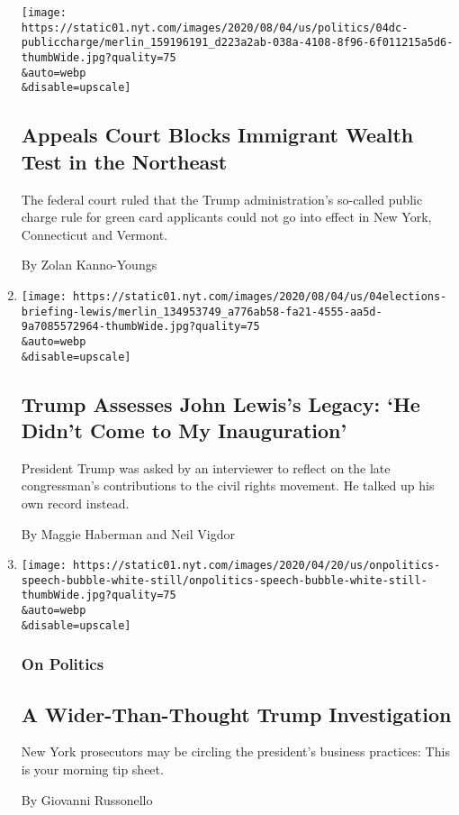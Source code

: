\begin{enumerate}
  \texttt{[image: https://static01.nyt.com/images/2020/08/04/us/politics/04dc-publiccharge/merlin\_159196191\_d223a2ab-038a-4108-8f96-6f011215a5d6-thumbWide.jpg?quality=75\\\&auto=webp\\\&disable=upscale]}

  \hypertarget{appeals-court-blocks-immigrant-wealth-test-in-the-northeast}{%
  \subsection{Appeals Court Blocks Immigrant Wealth Test in the
  Northeast}\label{appeals-court-blocks-immigrant-wealth-test-in-the-northeast}}

  The federal court ruled that the Trump administration's so-called
  public charge rule for green card applicants could not go into effect
  in New York, Connecticut and Vermont.

  By Zolan Kanno-Youngs
\item
  \href{/2020/08/04/us/politics/trump-john-lewis-axios.html}{}

  \texttt{[image: https://static01.nyt.com/images/2020/08/04/us/04elections-briefing-lewis/merlin\_134953749\_a776ab58-fa21-4555-aa5d-9a7085572964-thumbWide.jpg?quality=75\\\&auto=webp\\\&disable=upscale]}

  \hypertarget{trump-assesses-john-lewiss-legacy-he-didnt-come-to-my-inauguration}{%
  \subsection{Trump Assesses John Lewis's Legacy: `He Didn't Come to My
  Inauguration'}\label{trump-assesses-john-lewiss-legacy-he-didnt-come-to-my-inauguration}}

  President Trump was asked by an interviewer to reflect on the late
  congressman's contributions to the civil rights movement. He talked up
  his own record instead.

  By Maggie Haberman and Neil Vigdor
\item
  \href{/2020/08/04/us/politics/trump-prosecutors.html}{}

  \texttt{[image: https://static01.nyt.com/images/2020/04/20/us/onpolitics-speech-bubble-white-still/onpolitics-speech-bubble-white-still-thumbWide.jpg?quality=75\\\&auto=webp\\\&disable=upscale]}

  \hypertarget{on-politics}{%
  \subsubsection{On Politics}\label{on-politics}}

  \hypertarget{a-wider-than-thought-trump-investigation}{%
  \subsection{A Wider-Than-Thought Trump
  Investigation}\label{a-wider-than-thought-trump-investigation}}

  New York prosecutors may be circling the president's business
  practices: This is your morning tip sheet.

  By Giovanni Russonello
\end{enumerate}

